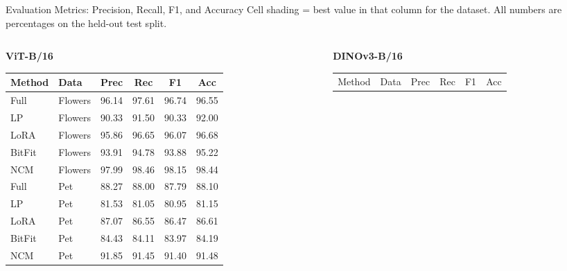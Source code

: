 \documentclass[10pt, aspectratio=169]{beamer}
\begin{document}
\begin{frame}[t]{Evaluation Metrics: Precision, Recall, F1, and Accuracy}
  \centering
  {\tiny Cell shading = best value in that column for the dataset. All numbers are percentages on the held-out test split.}

  \vspace{0.12cm}
  \begin{columns}[T]
    \begin{column}{0.49\textwidth}
      \centering
      {\scriptsize \textbf{ViT-B/16}} \\[0.05cm]
      \scriptsize
      \setlength{\tabcolsep}{2.6pt}
      \begin{tabular}{llcccc}
        \toprule
        Method & Data & Prec & Rec & F1 & Acc \\
        \midrule
        Full & Flowers & 96.14 & 97.61 & 96.74 & 96.55 \\
        LP & Flowers & 90.33 & 91.50 & 90.33 & 92.00 \\
        LoRA & Flowers & 95.86 & 96.65 & 96.07 & 96.68 \\
        BitFit & Flowers & 93.91 & 94.78 & 93.88 & 95.22 \\
        NCM & Flowers & \cellcolor{best}97.99 & \cellcolor{best}98.46 & \cellcolor{best}98.15 & \cellcolor{best}98.44 \\
        \midrule
        Full & Pet & 88.27 & 88.00 & 87.79 & 88.10 \\
        LP & Pet & 81.53 & 81.05 & 80.95 & 81.15 \\
        LoRA & Pet & 87.07 & 86.55 & 86.47 & 86.61 \\
        BitFit & Pet & 84.43 & 84.11 & 83.97 & 84.19 \\
        NCM & Pet & \cellcolor{best}91.85 & \cellcolor{best}91.45 & \cellcolor{best}91.40 & \cellcolor{best}91.48 \\
        \bottomrule
      \end{tabular}
    \end{column}
    \begin{column}{0.49\textwidth}
      \centering
      {\scriptsize \textbf{DINOv3-B/16}} \\[0.05cm]
      \scriptsize
      \setlength{\tabcolsep}{2.6pt}
      \begin{tabular}{llcccc}
        \toprule
        Method & Data & Prec & Rec & F1 & Acc \\

\end{tabular}
\end{column}
\end{columns}
\end{frame}
\end{document}
